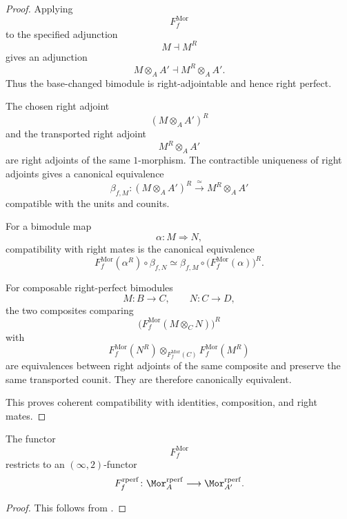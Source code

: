 \begin{proof}
Applying
\[
    F_f^{\mathrm{Mor}}
\]
to the specified adjunction
\[
    M\dashv M^R
\]
gives an adjunction
\[
    M\otimes_A A'
    \dashv
    M^R\otimes_A A'.
\]
Thus the base-changed bimodule is right-adjointable and hence right
perfect.

The chosen right adjoint
\[
    (M\otimes_A A')^R
\]
and the transported right adjoint
\[
    M^R\otimes_A A'
\]
are right adjoints of the same $1$-morphism. The contractible uniqueness
of right adjoints gives a canonical equivalence
\[
    \beta_{f,M}
    \colon
    (M\otimes_A A')^R
    \xrightarrow{\;\simeq\;}
    M^R\otimes_A A'
\]
compatible with the units and counits.

For a bimodule map
\[
    \alpha
    \colon
    M
    \Longrightarrow
    N,
\]
compatibility with right mates is the canonical equivalence
\[
    F_f^{\mathrm{Mor}}(\alpha^R)
    \circ
    \beta_{f,N}
    \simeq
    \beta_{f,M}
    \circ
    \bigl(
        F_f^{\mathrm{Mor}}(\alpha)
    \bigr)^R.
\]

For composable right-perfect bimodules
\[
    M
    \colon
    B
    \longrightarrow
    C,
    \qquad
    N
    \colon
    C
    \longrightarrow
    D,
\]
the two composites comparing
\[
    \bigl(
        F_f^{\mathrm{Mor}}(M\otimes_C N)
    \bigr)^R
\]
with
\[
    F_f^{\mathrm{Mor}}(N^R)
    \otimes_{F_f^{\mathrm{Mor}}(C)}
    F_f^{\mathrm{Mor}}(M^R)
\]
are equivalences between right adjoints of the same composite and preserve
the same transported counit. They are therefore canonically equivalent.

This proves coherent compatibility with identities, composition, and
right mates.
\end{proof}

\begin{corollary}
\label{cor:base-change-right-perfect-morita}
The functor
\[
    F_f^{\mathrm{Mor}}
\]
restricts to an $(\infty,2)$-functor
\[
    F_f^{\mathrm{rperf}}
    \colon
    \Mor_A^{\mathrm{rperf}}
    \longrightarrow
    \Mor_{A'}^{\mathrm{rperf}}.
\]
\end{corollary}

\begin{proof}
This follows from
.
\end{proof}

